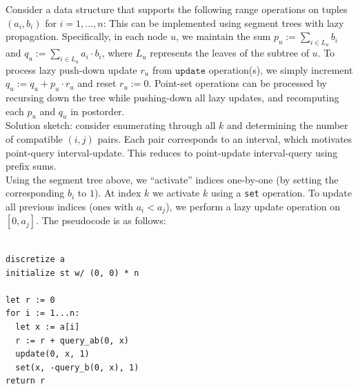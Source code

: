 \documentclass{article}
\begin{document}
\maketitle
  
  Consider a data structure that supports the following range operations on tuples $(a_i,b_i)$ for $i=1,\dots,n$:
  This can be implemented using segment trees with lazy propagation. Specifically, in each node $u$, we maintain the sum $p_u:=\sum_{i\in L_u} b_i$ and $q_u:=\sum_{i\in L_u} a_i\cdot b_i$, where $L_u$ represents the leaves of the subtree of $u$. To process lazy push-down update $r_u$ from $\texttt{update}$ operation(s), we simply increment $q_u:=q_u+p_u\cdot r_u$ and reset $r_u:= 0$. Point-set operations can be processed by recursing down the tree while pushing-down all lazy updates, and recomputing each $p_u$ and $q_u$ in postorder. \\

Solution sketch: consider enumerating through all $k$ and determining the number of compatible $(i,j)$ pairs. Each pair corresponds to an interval, which motivates point-query interval-update. This reduces to point-update interval-query using prefix sums.\\

Using the segment tree above, we ``activate'' indices one-by-one (by setting the corresponding $b_i$ to $1$). At index $k$ we activate $k$ using a \texttt{set} operation. To update all previous indices (ones with $a_i<a_j$), we perform a lazy update operation on $[0,a_j]$. The pseudocode is as follows:

\begin{verbatim}

discretize a
initialize st w/ (0, 0) * n

let r := 0
for i := 1...n:
  let x := a[i]
  r := r + query_ab(0, x)
  update(0, x, 1)
  set(x, -query_b(0, x), 1)
return r
\end{verbatim}
\end{document}

